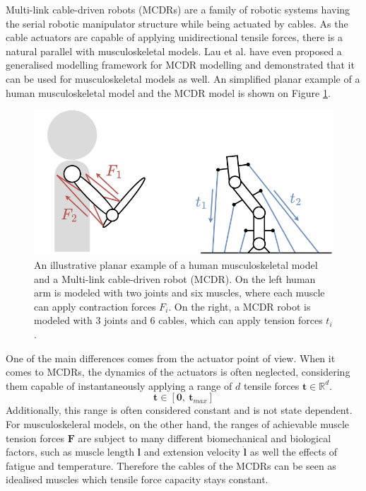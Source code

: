 Multi-link cable-driven robots (MCDRs) \cite{Wang2019} are a family of robotic systems having the serial robotic manipulator structure while being actuated by cables. As the cable actuators are capable of applying unidirectional tensile forces, there is a natural parallel with musculoskeletal models. Lau et al. \cite{Lau2013} have even proposed a generalised modelling framework for MCDR modelling and demonstrated that it can be used for musculoskeletal models as well. An simplified planar example of a human musculoskeletal model and the MCDR model is shown on Figure \ref{fig:muscle_mcdrs}.

\begin{figure}
    \centering
    \includegraphics[width=\linewidth]{Chapters/imgs/muscle_mcdrs.png}
    \caption{An illustrative planar example of a human musculoskeletal model and a Multi-link cable-driven robot (MCDR). On the left human arm is modeled with two joints and six muscles, where each muscle can apply contraction forces $F_i$. On the right, a MCDR robot is modeled with 3 joints and 6 cables, which can apply tension forces $t_i$.  }
    \label{fig:muscle_mcdrs}
\end{figure}


 



One of the main differences comes from the actuator point of view. When it comes to MCDRs, the dynamics of the actuators is often neglected, considering them capable of instantaneously applying a range of $d$ tensile forces $\bm{t}\in\mathbb{R}^d$.
\begin{equation}
    \bm{t} \in [\bm{0},~\bm{t}_{max}]
\end{equation}
Additionally, this range is often considered constant and is not state dependent. For musculoskeleral models, on the other hand, the ranges of achievable muscle tension forces $\bm{F}$ are subject to many different biomechanical and biological factors, such as muscle length $\bm{l}$ and extension velocity $\dot{\bm{l}}$ as well the effects of fatigue and temperature.
Therefore the cables of the MCDRs can be seen as idealised muscles which tensile force capacity stays constant. 


